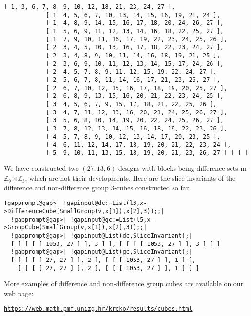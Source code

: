 \documentclass[a4paper,11pt]{report}
\begin{document}
{{\begin{Verbatim}[commandchars=!@|,fontsize=\small,frame=single,label=Example]
            [ 1, 3, 6, 7, 8, 9, 10, 12, 18, 21, 23, 24, 27 ], 
            [ 1, 4, 5, 6, 7, 10, 13, 14, 15, 16, 19, 21, 24 ], 
            [ 1, 4, 8, 9, 14, 15, 16, 17, 18, 20, 24, 26, 27 ], 
            [ 1, 5, 6, 9, 11, 12, 13, 14, 16, 18, 22, 25, 27 ], 
            [ 1, 7, 9, 10, 11, 16, 17, 19, 22, 23, 24, 25, 26 ], 
            [ 2, 3, 4, 5, 10, 13, 16, 17, 18, 22, 23, 24, 27 ], 
            [ 2, 3, 4, 8, 9, 10, 11, 14, 16, 18, 19, 21, 25 ], 
            [ 2, 3, 6, 9, 10, 11, 12, 13, 14, 15, 17, 24, 26 ], 
            [ 2, 4, 5, 7, 8, 9, 11, 12, 15, 19, 22, 24, 27 ], 
            [ 2, 5, 6, 7, 8, 11, 14, 16, 17, 21, 23, 26, 27 ], 
            [ 2, 6, 7, 10, 12, 15, 16, 17, 18, 19, 20, 25, 27 ], 
            [ 2, 6, 8, 9, 13, 15, 16, 20, 21, 22, 23, 24, 25 ], 
            [ 3, 4, 5, 6, 7, 9, 15, 17, 18, 21, 22, 25, 26 ], 
            [ 3, 4, 7, 11, 12, 13, 16, 20, 21, 24, 25, 26, 27 ], 
            [ 3, 5, 6, 8, 10, 14, 19, 20, 22, 24, 25, 26, 27 ], 
            [ 3, 7, 8, 12, 13, 14, 15, 16, 18, 19, 22, 23, 26 ], 
            [ 4, 5, 7, 8, 9, 10, 12, 13, 14, 17, 20, 23, 25 ], 
            [ 4, 6, 11, 12, 14, 17, 18, 19, 20, 21, 22, 23, 24 ], 
            [ 5, 9, 10, 11, 13, 15, 18, 19, 20, 21, 23, 26, 27 ] ] ] ]
\end{Verbatim}
 We have constructed two $(27,13,6)$ designs with blocks being difference sets in ${\ensuremath{\mathbb Z}}_9\rtimes {\ensuremath{\mathbb Z}}_3$, which are not their developments. Here are the slice invariants of the
difference and non-difference group 3-cubes constructed so far. 
\begin{Verbatim}[commandchars=!@|,fontsize=\small,frame=single,label=Example]
  !gapprompt@gap>| !gapinput@dc:=List(l3,x->DifferenceCube(SmallGroup(v,x[1]),x[2],3));;|
  !gapprompt@gap>| !gapinput@gc:=List(l5,x->GroupCube(SmallGroup(v,x[1]),x[2],3));;|
  !gapprompt@gap>| !gapinput@List(dc,SliceInvariant);|
  [ [ [ [ [ 1053, 27 ] ], 3 ] ], [ [ [ [ 1053, 27 ] ], 3 ] ] ]
  !gapprompt@gap>| !gapinput@List(gc,SliceInvariant);|
  [ [ [ [ [ 27, 27 ] ], 2 ], [ [ [ 1053, 27 ] ], 1 ] ], 
    [ [ [ [ 27, 27 ] ], 2 ], [ [ [ 1053, 27 ] ], 1 ] ] ]
\end{Verbatim}
 More examples of difference and non-difference group cubes are available on
our web page: 

 \href{https://web.math.pmf.unizg.hr/~krcko/results/cubes.html} {\texttt{https://web.math.pmf.unizg.hr/\texttt{}krcko/results/cubes.html}} }

 }

  
\end{document}
